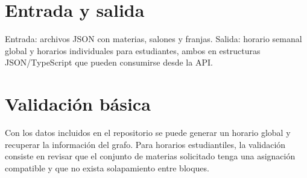 \section{Entrada y salida}

Entrada: archivos JSON con materias, salones y franjas. Salida: horario semanal global y horarios individuales para estudiantes, ambos en estructuras JSON/TypeScript que pueden consumirse desde la API.

\section{Validación básica}

Con los datos incluidos en el repositorio se puede generar un horario global y recuperar la información del grafo. Para horarios estudiantiles, la validación consiste en revisar que el conjunto de materias solicitado tenga una asignación compatible y que no exista solapamiento entre bloques.
